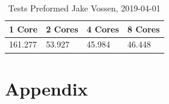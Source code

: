 \documentclass{article}
\begin{document}
\begin{table}[H]
\centering
\caption{\begingroup \fontsize{10pt}{12pt}\selectfont Tests Preformed
Jake Vossen, 2019-04-01 \endgroup}
\label{my-label}
\begin{tabular}{l|l|l|l}
                                      1 Core  & 2 Cores & 4 Cores & 8
                                                                    Cores
  \\ \hline
 161.277 & 53.927  & 45.984  & 46.448 
\end{tabular}
\end{table}

\section{Appendix}
\end{document}
